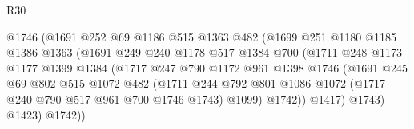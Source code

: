 \begin{lexlean}{R30}
\begin{coremodule}
                                  @1746
                                  (@1691
                                    @252
                                    @69
                                    @1186
                                    @515
                                    @1363
                                    @482
                                    (@1699
                                      @251
                                      @1180
                                      @1185
                                      @1386
                                      @1363
                                      (@1691
                                        @249
                                        @240
                                        @1178
                                        @517
                                        @1384
                                        @700
                                        (@1711
                                          @248
                                          @1173
                                          @1177
                                          @1399
                                          @1384
                                          (@1717
                                            @247
                                            @790
                                            @1172
                                            @961
                                            @1398
                                            @1746
                                            (@1691
                                              @245
                                              @69
                                              @802
                                              @515
                                              @1072
                                              @482
                                              (@1711
                                                @244
                                                @792
                                                @801
                                                @1086
                                                @1072
                                                (@1717 @240 @790 @517 @961 @700 @1746 @1743)
                                                @1099)
                                              @1742))
                                          @1417)
                                        @1743)
                                      @1423)
                                    @1742))

\end{coremodule}
\end{lexlean}

